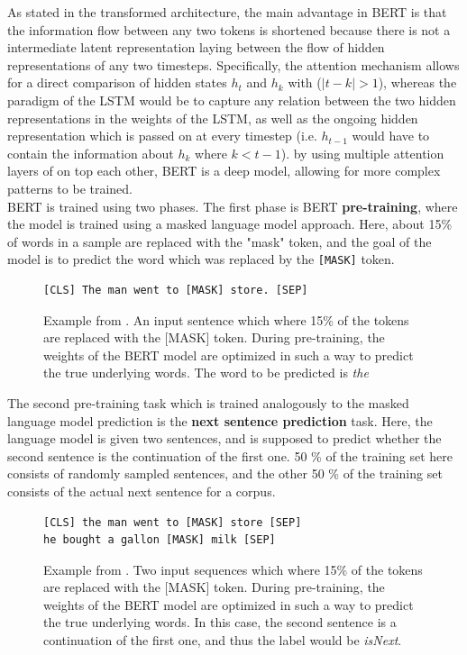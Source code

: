 \documentclass[a4paper,12pt,twoside,openright]{report}
\begin{document}
As stated in the transformed architecture, the main advantage in BERT is that the information flow between any two tokens is shortened because there is not a intermediate latent representation laying between the flow of hidden representations of any two timesteps.
Specifically, the attention mechanism allows for a direct comparison of hidden states $h_t$ and $h_k$ with ($|t - k| > 1$), whereas the paradigm of the LSTM would be to capture any relation between the two hidden representations in the weights of the LSTM, as well as the ongoing hidden representation which is passed on at every timestep (i.e. $h_{t-1}$ would have to contain the information about $h_k$ where $k < t - 1$).
by using multiple attention layers of on top each other, BERT is a deep model, allowing for more complex patterns to be trained. \\

BERT is trained using two phases. 
The first phase is BERT \textbf{pre-training}, where the model is trained using a masked language model approach. 
Here, about 15\% of words in a sample are replaced with the "mask" token, and the goal of the model is to predict the word which was replaced by the \Verb#[MASK]# token.

\begin{figure}[H]
\begin{verbatim}
[CLS] The man went to [MASK] store. [SEP]
\end{verbatim}
\caption{Example from \cite{devlin18}. 
An input sentence which where 15\% of the tokens are replaced with the [MASK] token. 
During pre-training, the weights of the BERT model are optimized in such a way to predict the true underlying words.
The word to be predicted is \textit{the}
}
\end{figure}

The second pre-training task which is trained analogously to the masked language model prediction is the \textbf{next sentence prediction} task.
Here, the language model is given two sentences, and is supposed to predict whether the second sentence is the continuation of the first one.
50 \% of the training set here consists of randomly sampled sentences, and the other 50 \% of the training set consists of the actual next sentence for a corpus.

\begin{figure}[H]
\begin{verbatim}
[CLS] the man went to [MASK] store [SEP]
he bought a gallon [MASK] milk [SEP]
\end{verbatim}
\caption{Example from \cite{devlin18}. 
Two input sequences which where 15\% of the tokens are replaced with the [MASK] token. 
During pre-training, the weights of the BERT model are optimized in such a way to predict the true underlying words.
In this case, the second sentence is a continuation of the first one, and thus the label would be \textit{isNext}.
}
\end{figure}
\end{document}
